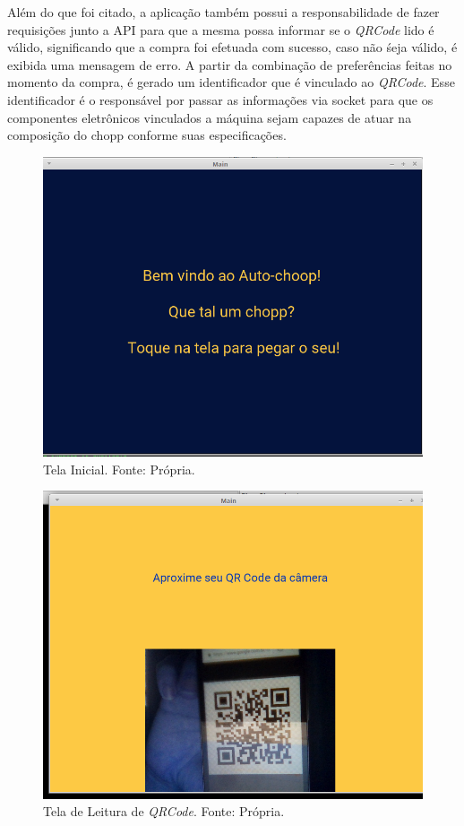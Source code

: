         Além do que foi citado, a aplicação também possui a responsabilidade de fazer requisições junto a API
        para que a mesma possa informar se o \textit{QRCode} lido é válido, significando que a compra foi 
        efetuada com sucesso, caso não śeja válido, é exibida uma mensagem de erro. A partir da combinação
        de preferências feitas no momento da compra, é gerado um identificador que é vinculado ao 
        \textit{QRCode}. Esse identificador é o responsável por passar as informações via socket para que
        os componentes eletrônicos vinculados a máquina sejam capazes de atuar na composição do chopp conforme
        suas especificações.

        \begin{figure}[H]
            \centering
            \includegraphics[scale= 0.4]{figuras/home-screen.png}
            \caption{Tela Inicial. Fonte: Própria.}
            \label{home-screen}
        \end{figure}

        \begin{figure}[H]
            \centering
            \includegraphics[scale= 0.4]{figuras/leitor-qrcode.png}
            \caption{Tela de Leitura de \textit{QRCode}. Fonte: Própria.}
            \label{leitor-qrcode}
        \end{figure}


